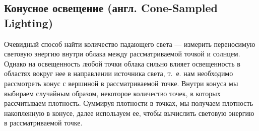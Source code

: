 \subsection{Конусное освещение (англ. Cone-Sampled Lighting)}
Очевидный способ найти количество падающего света — измерить переносимую световую энергию внутри облака между рассматриваемой точкой и солнцем. Однако на освещенность любой точки облака сильно влияет освещенность в областях вокруг нее в направлении источника света, т.~е. нам необходимо рассмотреть конус с вершиной в рассматриваемой точке. Внутри конуса мы выбираем случайным образом, некоторое количество точек, в которых рассчитываем плотность. Суммируя плотности в точках, мы получаем плотность накопленную в конусе, далее используем ее, чтобы вычислить световую энергию в рассматриваемой точке.


